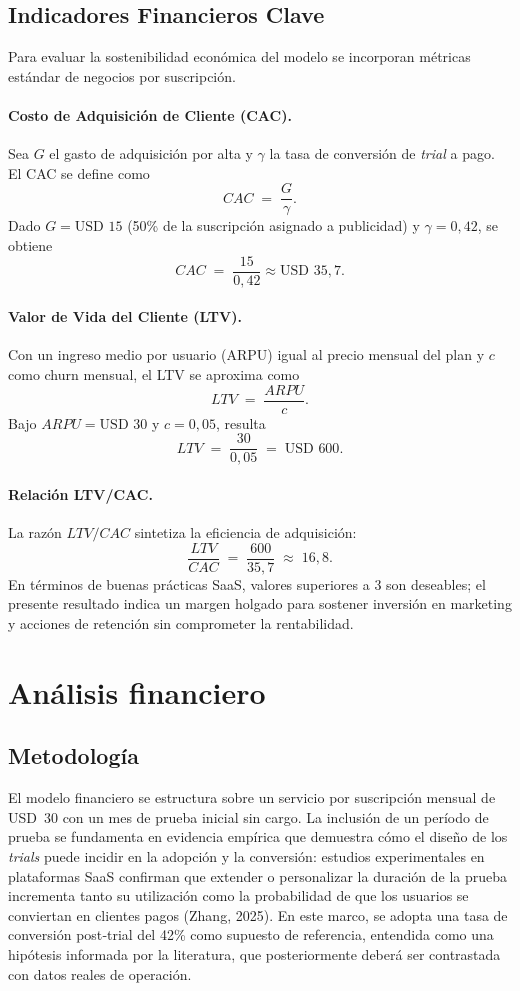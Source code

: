 \subsection{Indicadores Financieros Clave}
Para evaluar la sostenibilidad económica del modelo se incorporan métricas estándar de negocios por suscripción.

\paragraph{Costo de Adquisición de Cliente (CAC).}
Sea $G$ el gasto de adquisición por alta y $\gamma$ la tasa de conversión de \emph{trial} a pago. El CAC se define como
\[
CAC \;=\; \frac{G}{\gamma}.
\]
Dado $G = \text{USD }15$ (50\% de la suscripción asignado a publicidad) y $\gamma = 0{,}42$, se obtiene
\[
CAC \;=\; \frac{15}{0{,}42} \approx \text{USD }35{,}7.
\]

\paragraph{Valor de Vida del Cliente (LTV).}
Con un ingreso medio por usuario (ARPU) igual al precio mensual del plan y $c$ como churn mensual, el LTV se aproxima como
\[
LTV \;=\; \frac{ARPU}{c}.
\]
Bajo $ARPU = \text{USD }30$ y $c = 0{,}05$, resulta
\[
LTV \;=\; \frac{30}{0{,}05} \;=\; \text{USD }600.
\]

\paragraph{Relación LTV/CAC.}
La razón $LTV/CAC$ sintetiza la eficiencia de adquisición:
\[
\frac{LTV}{CAC} \;=\; \frac{600}{35{,}7} \;\approx\; 16{,}8.
\]
En términos de buenas prácticas SaaS, valores superiores a 3 son deseables; el presente resultado indica un margen holgado para sostener inversión en marketing y acciones de retención sin comprometer la rentabilidad.



\section{Análisis financiero}

\subsection{Metodología}

El modelo financiero se estructura sobre un servicio por suscripción mensual de USD~30 con un mes de prueba inicial sin cargo. La inclusión de un período de prueba se fundamenta en evidencia empírica que demuestra cómo el diseño de los \textit{trials} puede incidir en la adopción y la conversión: estudios experimentales en plataformas SaaS confirman que extender o personalizar la duración de la prueba incrementa tanto su utilización como la probabilidad de que los usuarios se conviertan en clientes pagos (Zhang, 2025). En este marco, se adopta una tasa de conversión post‐trial del 42\% como supuesto de referencia, entendida como una hipótesis informada por la literatura, que posteriormente deberá ser contrastada con datos reales de operación.

